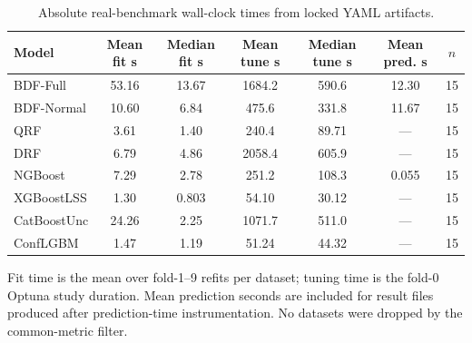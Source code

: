\begin{table}[htbp]
\centering
\caption{Absolute real-benchmark wall-clock times from locked YAML artifacts.}
\label{tab:real-benchmark-timing}
\begin{tabular}{lcccccc}
\toprule
Model & Mean fit s & Median fit s & Mean tune s & Median tune s & Mean pred. s & $n$ \\
\midrule
BDF-Full & 53.16 & 13.67 & 1684.2 & 590.6 & 12.30 & 15 \\
BDF-Normal & 10.60 & 6.84 & 475.6 & 331.8 & 11.67 & 15 \\
QRF & 3.61 & 1.40 & 240.4 & 89.71 & --- & 15 \\
DRF & 6.79 & 4.86 & 2058.4 & 605.9 & --- & 15 \\
NGBoost & 7.29 & 2.78 & 251.2 & 108.3 & 0.055 & 15 \\
XGBoostLSS & 1.30 & 0.803 & 54.10 & 30.12 & --- & 15 \\
CatBoostUnc & 24.26 & 2.25 & 1071.7 & 511.0 & --- & 15 \\
ConfLGBM & 1.47 & 1.19 & 51.24 & 44.32 & --- & 15 \\
\bottomrule
\end{tabular}
\par\smallskip\footnotesize{Fit time is the mean over fold-1--9 refits per dataset; tuning time is the fold-0 Optuna study duration. Mean prediction seconds are included for result files produced after prediction-time instrumentation. No datasets were dropped by the common-metric filter.}
\end{table}
